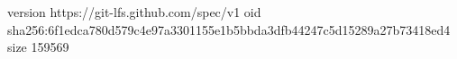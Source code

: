 version https://git-lfs.github.com/spec/v1
oid sha256:6f1edca780d579c4e97a3301155e1b5bbda3dfb44247c5d15289a27b73418ed4
size 159569
